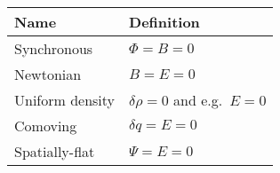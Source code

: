 \begin{tabular}{ll}
 \toprule
  Name & Definition \\
 \midrule
 \midrule
 Synchronous & \(\Phi=B=0\) \\
 Newtonian & \(B=E=0\) \\
 Uniform density & \(\delta\rho=0\) and e.g.\ \(E=0\) \\
 Comoving & \(\delta q = E = 0\) \\
 Spatially-flat & \(\Psi=E=0\) \\
 \bottomrule
\end{tabular}
